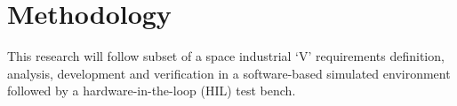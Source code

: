 \section{Methodology}\label{CHAP1_5}


This research will follow subset of a space industrial ‘V’ requirements definition, analysis, development and verification in a software-based simulated environment followed by a hardware-in-the-loop (HIL) test bench. 

